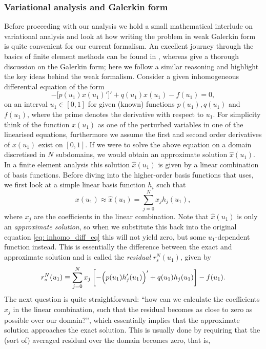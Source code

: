 \subsubsection{Variational analysis and Galerkin form}
Before proceeding with our analysis we hold a small mathematical interlude on variational analysis and look at how writing the problem in weak Galerkin form is quite convenient for our current formalism. An excellent journey through the basics of finite element methods can be found in \citet{book_fem1}, whereas \citet{book_MHD} give a thorough discussion on the Galerkin form; here we follow a similar reasoning and highlight the key ideas behind the weak formalism. Consider a given inhomogeneous differential equation of the form
\begin{equation} \label{eq: inhomo_diff_eq}
  -\bigl[p(u_1)x(u_1)'\bigr]' + q(u_1)x(u_1) - f(u_1) = 0,
\end{equation}
on an interval $u_1 \in [0, 1]$ for given (known) functions $p(u_1), q(u_1)$ and $f(u_1)$, where the prime denotes the derivative with respect to $u_1$. For simplicity think of the function $x(u_1)$ as one of the perturbed variables in one of the linearised equations, furthermore we assume the first and second order derivatives of $x(u_1)$ exist on
$[0, 1]$. If we were to solve the above equation on a domain discretised in $N$ subdomains, we would obtain an approximate solution $\hat{x}(u_1)$. In a finite element analysis this solution $\hat{x}(u_1)$ is given by a linear combination of basis functions. Before diving into the higher-order basis functions that {\legolas} uses, we first look at a simple linear basis function $h_i$ such that
\begin{equation} \label{eq: linear_basisfunctions}
  x(u_1) \approx \hat{x}(u_1) = \sum_{j = 0}^N x_j h_j(u_1),
\end{equation}
where $x_j$ are the coefficients in the linear combination. Note that $\hat{x}(u_1)$ is only an \emph{approximate solution}, so when we substitute this back into the original equation \eqref{eq: inhomo_diff_eq} this will not yield zero, but some $u_1$-dependent function instead. This is essentially the difference between the exact and approximate solution and is called the \emph{residual} $r_s^N(u_1)$, given by
\begin{equation} \label{eq: residual}
  r_s^N(u_1) \equiv \sum_{j=0}^N x_j\left[-\Bigl(p(u_1)h_j'(u_1)\Bigr)' + q(u_1)h_j(u_1)\right] - f(u_1).
\end{equation}
The next question is quite straightforward: ``how can we calculate the coefficients $x_j$ in the linear combination, such that the residual becomes as close to zero as possible over our domain?'', which essentially implies that the approximate solution approaches the exact solution. This is usually done by requiring that the (sort of) averaged residual over the domain becomes zero, that is,
